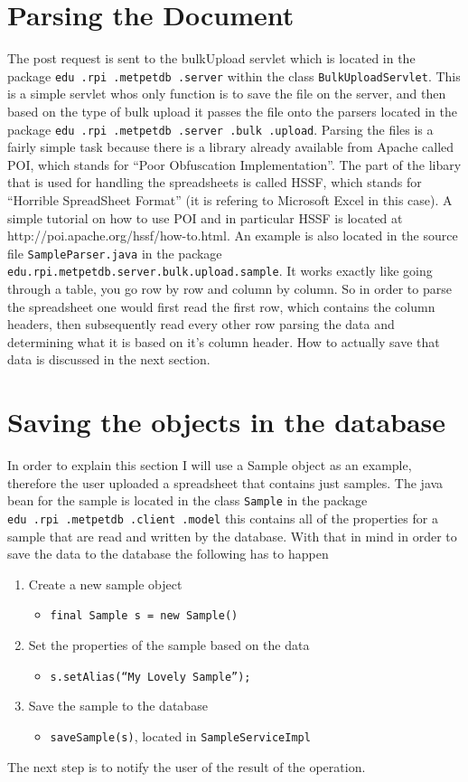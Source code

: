 \documentclass[10pt,letterpaper,onecolumn,oneside]{report}
\begin{document}
\section{Parsing the Document}
The post request is sent to the bulkUpload servlet which is located in the package \texttt{edu\ .rpi\ .metpetdb\ .server} within the class \texttt{BulkUploadServlet}. 
 This is a simple servlet whos only function is to save the file on the server, and then based on the type of bulk upload it passes the file onto the parsers located in the package \texttt{edu\ .rpi\ .metpetdb\ .server\ .bulk\ .upload}.  Parsing the files is a fairly simple task because there is a library already available from Apache called POI, which stands for ``Poor Obfuscation Implementation''.  The part of the libary that is used for handling the spreadsheets is called HSSF, which stands for ``Horrible SpreadSheet Format'' (it is refering to Microsoft Excel in this case).  A simple tutorial on how to use POI and in particular HSSF is located at http://poi.apache.org/hssf/how-to.html.  An example is also located in the source file \texttt{SampleParser.java} in the package \texttt{edu.rpi.metpetdb.server.bulk.upload.sample}.  It works exactly like going through a table, you go row by row and column by column.  So in order to parse the spreadsheet one would first read the first row, which contains the column headers, then subsequently read every other row parsing the data and determining what it is based on it's column header.  How to actually save that data is discussed in the next section.
\section{Saving the objects in the database}
In order to explain this section I will use a Sample object as an example, therefore the user uploaded a spreadsheet that contains just samples. 
 The java bean for the sample is located in the class \texttt{Sample} in the package \texttt{edu\ .rpi\ .metpetdb\ .client\ .model} this contains all of the properties for a sample that are read and written by the database.  With that in mind in order to save the data to the database the following has to happen
\begin{enumerate}
\item Create a new sample object
\begin{itemize}
\item \texttt{final Sample s = new Sample()}
\end{itemize}
\item Set the properties of the sample based on the data
\begin{itemize}
\item \texttt{s.setAlias(``My Lovely Sample'');}
\end{itemize}
\item Save the sample to the database
\begin{itemize}
\item \texttt{saveSample(s)}, located in \texttt{SampleServiceImpl}
\end{itemize}
\end{enumerate}
The next step is to notify the user of the result of the operation.
\end{document}
